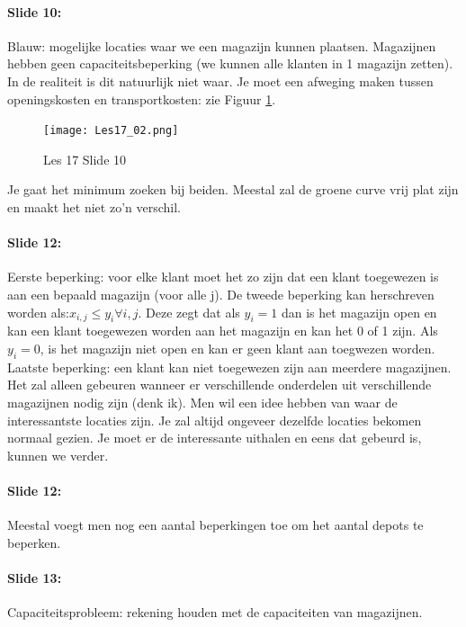 \documentclass[10pt,a4paper]{report}
\begin{document}
\paragraph{Slide 10:} Blauw: mogelijke locaties waar we een magazijn kunnen plaatsen. Magazijnen hebben geen capaciteitsbeperking (we kunnen alle klanten in 1 magazijn zetten). In de realiteit is dit natuurlijk niet waar. Je moet een afweging maken tussen openingskosten en transportkosten: zie Figuur \ref{les17_02}.\\

\begin{figure}[h!]
\centering
\texttt{[image: Les17\_02.png]}
\caption{Les 17 Slide 10} 
\label{les17_02}
\end{figure}

Je gaat het minimum zoeken bij beiden. Meestal zal de groene curve vrij plat zijn en maakt het niet zo'n verschil.

\paragraph{Slide 12:} Eerste beperking: voor elke klant moet het zo zijn dat een klant toegewezen is aan een bepaald magazijn (voor alle j). De tweede beperking kan herschreven worden als:$ x_{i,j} \leq y_{i} \forall i,j$. Deze zegt dat als $y_{i} = 1$ dan is het magazijn open en kan een klant toegewezen worden aan het magazijn en kan het 0 of 1 zijn. Als $y_{i} = 0$, is het magazijn niet open en kan er geen klant aan toegwezen worden.\\
Laatste beperking: een klant kan niet toegewezen zijn aan meerdere magazijnen. Het zal alleen gebeuren wanneer er verschillende onderdelen uit verschillende magazijnen nodig zijn (denk ik). %
Men wil een idee hebben van waar de interessantste locaties zijn. Je zal altijd ongeveer dezelfde locaties bekomen normaal gezien. Je moet er de interessante uithalen en eens dat gebeurd is, kunnen we verder.

\paragraph{Slide 12:} Meestal voegt men nog een aantal beperkingen toe om het aantal depots te beperken. 

\paragraph{Slide 13:} Capaciteitsprobleem: rekening houden met de capaciteiten van magazijnen.
\end{document}
